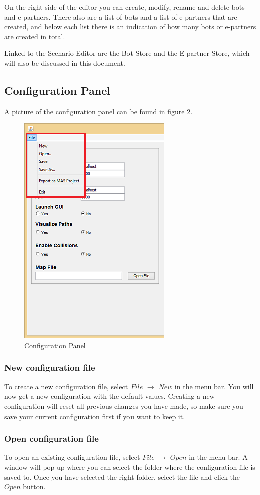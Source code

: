 On the right side of the editor you can create, modify, rename and delete bots and e-partners. There also are a list of bots and a list of e-partners that are created, and below each list there is an indication of how many bots or e-partners are created in total.

Linked to the Scenario Editor are the Bot Store and the E-partner Store, which will also be discussed in this document.
\pagebreak
\subsection{Configuration Panel}
A picture of the configuration panel can be found in figure 2.
\begin{figure}[h]
\begin{center}
\includegraphics{ScenarioEditor/config.png}
\end{center}
\caption{Configuration Panel}
\end{figure}
\subsubsection{New configuration file}
To create a new configuration file, select $File$ $\to$ $New$ in the menu bar. You will now get a new configuration with the default values. Creating a new configuration will reset all previous changes you have made, so make sure you save your current configuration first if you want to keep it.

\subsubsection{Open configuration file}
To open an existing configuration file, select $File$ $\to$ $Open$ in the menu bar. A window will pop up where you can select the folder where the configuration file is saved to. Once you have selected the right folder, select the file and click the $Open$ button.

